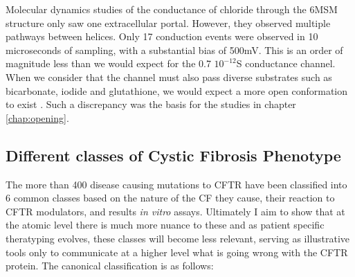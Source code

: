 Molecular dynamics studies of the conductance of chloride through the 6MSM structure only saw one extracellular portal. However, they observed multiple pathways between helices. Only 17 conduction events were observed in 10 microseconds of sampling, with a substantial bias of 500mV. This is an order of magnitude less than we would expect for the 0.7 $10^{-12}$S conductance channel. When we consider that the channel must also pass diverse substrates such as bicarbonate, iodide and glutathione, we would expect a more open conformation to exist \cite{kogan2003,linsdell1998}. Such a discrepancy was the basis for the studies in chapter \ref{chap:opening}.


\subsection{Different classes of Cystic Fibrosis Phenotype}
The more than 400 disease causing mutations to CFTR have been classified into 6 common classes based on the nature of the CF they cause, their reaction to CFTR modulators, and results \textit{in vitro} assays. Ultimately I aim to show that at the atomic level there is much more nuance to these and as patient specific theratyping evolves, these classes will become less relevant, serving as illustrative tools only to communicate at a higher level what is going wrong with the CFTR protein. The canonical classification is as follows:

